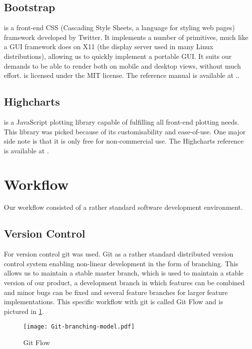 \documentclass[a4paper, openany, oneside]{memoir}
\begin{document}
\subsection{Bootstrap}
\label{sec:bootstrap}
 is a front-end CSS (Cascading Style Sheets, a language for styling web pages) framework developed by Twitter. It implements a number of primitives, much like a GUI framework does on X11 (the display server used in many Linux distributions), allowing us to quickly implement a portable GUI. It suits our demands to be able to render both on mobile and desktop views, without much effort.  is licensed under the MIT license. The reference manual is available at \cite{bootstrap}..

\subsection{Highcharts}
\label{sec:highcharts}
 is a JavaScript plotting library capable of fulfilling all front-end plotting needs. This library was picked because of its customisability and ease-of-use. One major side note is that it is only free for non-commercial use. The Highcharts reference is available at \cite{highcharts}.

\section{Workflow}
\label{sec:workflow}
Our workflow consisted of a rather standard software development environment.

\subsection{Version Control}
\label{sec:version-control}
For version control git was used. Git as a rather standard distributed version control system enabling non-linear development in the form of branching. This allows us to maintain a stable master branch, which is used to maintain a stable version of our product, a development branch in which features can be combined and minor bugs can be fixed and several feature branches for larger feature implementations. This specific workflow with git is called Git Flow\cite{driessen2010successful} and is pictured in \cref{fig:gitflow}.


\begin{figure}[h]
    \centering
    \texttt{[image: Git-branching-model.pdf]}
    \caption{Git Flow}
    \label{fig:gitflow}
\end{figure}
\end{document}
